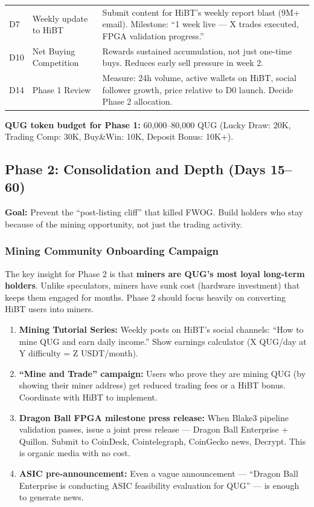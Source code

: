 \documentclass[11pt,a4paper]{article}
\begin{document}
\begin{center}
\begin{longtable}{C{1.5cm} L{3.5cm} L{7cm}}
  D7 & Weekly update to HiBT & Submit content for HiBT's weekly report blast (9M+ email). Milestone: ``1 week live — X trades executed, FPGA validation progress.'' \\

  D10 & Net Buying Competition & Rewards sustained accumulation, not just one-time buys. Reduces early sell pressure in week 2. \\

  D14 & Phase 1 Review & Measure: 24h volume, active wallets on HiBT, social follower growth, price relative to D0 launch. Decide Phase 2 allocation. \\
\end{longtable}
\end{center}

\textbf{QUG token budget for Phase 1:} 60,000--80,000 QUG (Lucky Draw: 20K, Trading Comp: 30K, Buy\&Win: 10K, Deposit Bonus: 10K+).

\subsection{Phase 2: Consolidation and Depth (Days 15--60)}

\textbf{Goal:} Prevent the ``post-listing cliff'' that killed FWOG. Build holders who stay because of the mining opportunity, not just the trading activity.

\subsubsection{Mining Community Onboarding Campaign}

The key insight for Phase 2 is that \textbf{miners are QUG's most loyal long-term holders}. Unlike speculators, miners have sunk cost (hardware investment) that keeps them engaged for months. Phase 2 should focus heavily on converting HiBT users into miners.

\begin{enumerate}[leftmargin=1.5em]
  \item \textbf{Mining Tutorial Series:} Weekly posts on HiBT's social channels: ``How to mine QUG and earn daily income.'' Show earnings calculator (X QUG/day at Y difficulty = Z USDT/month).
  \item \textbf{``Mine and Trade'' campaign:} Users who prove they are mining QUG (by showing their miner address) get reduced trading fees or a HiBT bonus. Coordinate with HiBT to implement.
  \item \textbf{Dragon Ball FPGA milestone press release:} When Blake3 pipeline validation passes, issue a joint press release — Dragon Ball Enterprise + Quillon. Submit to CoinDesk, Cointelegraph, CoinGecko news, Decrypt. This is organic media with no cost.
  \item \textbf{ASIC pre-announcement:} Even a vague announcement — ``Dragon Ball Enterprise is conducting ASIC feasibility evaluation for QUG'' — is enough to generate news.
\end{enumerate}
\end{document}
